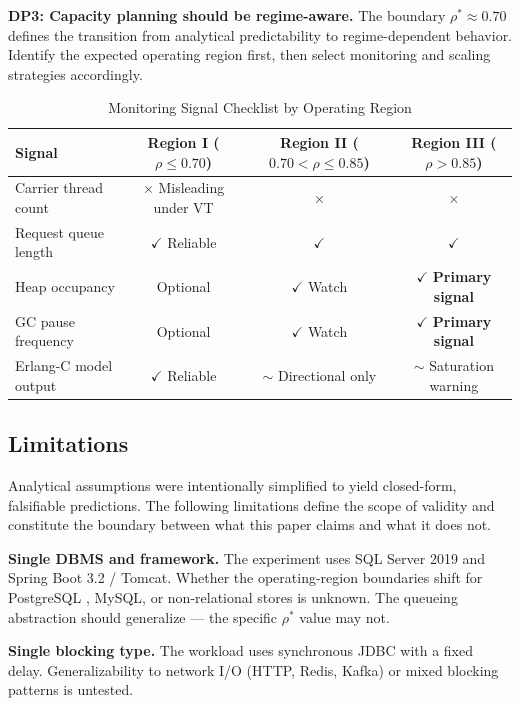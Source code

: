 \documentclass[10pt]{article}
\begin{document}
\textbf{DP3: Capacity planning should be regime-aware.}
The boundary $\rho^* \approx 0.70$ defines the transition from analytical predictability to regime-dependent behavior. Identify the expected operating region first, then select monitoring and scaling strategies accordingly.

\begin{table}[t]
\centering
\caption{Monitoring Signal Checklist by Operating Region}
\label{tab:monitoring}
\begin{tabular}{@{}lccc@{}}
\toprule
\textbf{Signal} & \textbf{Region I ($\rho \leq 0.70$)} & \textbf{Region II ($0.70 < \rho \leq 0.85$)} & \textbf{Region III ($\rho > 0.85$)} \\
\midrule
Carrier thread count  & $\times$ Misleading under VT & $\times$ & $\times$ \\
Request queue length  & $\checkmark$ Reliable        & $\checkmark$ & $\checkmark$ \\
Heap occupancy        & Optional                     & $\checkmark$ Watch & $\checkmark$ \textbf{Primary signal} \\
GC pause frequency    & Optional                     & $\checkmark$ Watch & $\checkmark$ \textbf{Primary signal} \\
Erlang-C model output & $\checkmark$ Reliable        & $\sim$ Directional only & $\sim$ Saturation warning \\
\bottomrule
\end{tabular}
\end{table}

\subsection{Limitations}
\label{sec:limitations}

Analytical assumptions were intentionally simplified to yield closed-form, falsifiable predictions. The following limitations define the scope of validity and constitute the boundary between what this paper claims and what it does not.

\textbf{Single DBMS and framework.} The experiment uses SQL Server 2019 and Spring Boot 3.2 / Tomcat. Whether the operating-region boundaries shift for PostgreSQL \cite{vershinin2021}, MySQL, or non-relational stores \cite{sagan2026} is unknown. The queueing abstraction should generalize --- the specific $\rho^*$ value may not.

\textbf{Single blocking type.} The workload uses synchronous JDBC with a fixed delay. Generalizability to network I/O (HTTP, Redis, Kafka) or mixed blocking patterns is untested.
\end{document}
